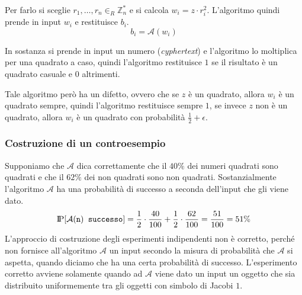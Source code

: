 Per farlo si sceglie $r_1, \dots, r_n \in_R \mathbb{Z}_n^*$ e
si calcola $w_i = z \cdot r_i^2$. L'algoritmo quindi prende in input $w_i$ e restituisce
$b_i$.
\[
  b_i = \mathcal{A}(w_i)
\]

In sostanza si prende in input un numero (\textit{cyphertext}) e l'algoritmo lo moltiplica per una 
quadrato a caso, quindi l'algoritmo restituisce $1$ se il risultato è un quadrato casuale e $0$
altrimenti.

Tale algoritmo però ha un difetto, ovvero che se $z$ è un quadrato, allora $w_i$ è un quadrato
sempre, quindi l'algoritmo restituisce sempre $1$, se invece $z$ non è un quadrato, allora
$w_i$ è un quadrato con probabilità $\frac{1}{2} + \epsilon$.
\subsubsection{Costruzione di un controesempio}
Supponiamo che $\mathcal{A}$ dica correttamente che il $40\%$ dei numeri quadrati sono quadrati e 
che il $62\%$ dei non quadrati sono non quadrati. Sostanzialmente l'algoritmo $\mathcal{A}$
ha una probabilità di successo a seconda dell'input che gli viene dato. 
\[
  \text{I\kern-0.15em P}[\mathcal{A}(\texttt{n})\texttt{ successo}] = \frac{1}{2} \cdot \frac{40}{100} + 
  \frac{1}{2} \cdot \frac{62}{100} = \frac{51}{100} = 51\%
\]
L'approccio di costruzione degli esperimenti indipendenti non è corretto, perché 
non fornisce all'algoritmo $\mathcal{A}$ un input secondo la misura di probabilità
che $\mathcal{A}$ si aspetta, quando diciamo che ha una certa probabilità di successo.
L'esperimento corretto avviene solamente quando ad $\mathcal{A}$ viene dato un input
un oggetto che sia distribuito uniformemente tra gli oggetti con simbolo di Jacobi $1$.
